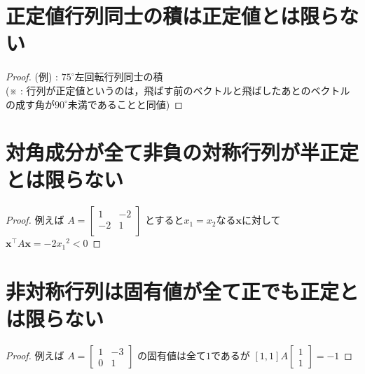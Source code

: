     \section{正定値行列同士の積は正定値とは限らない}
        \begin{proof}
            \quad\par
            (例) : $75^\circ$左回転行列同士の積\\
            (※ : 行列が正定値というのは，飛ばす前のベクトルと飛ばしたあとのベクトルの成す角が$90^\circ$未満であることと同値)
        \end{proof}
    \section{対角成分が全て非負の対称行列が半正定とは限らない}
        \begin{proof}
            \quad\par
            例えば
            $
                A =
                \left[
                    \begin{array}{cc}
                        1 & -2\\
                        -2 & 1\\
                    \end{array}
                \right]
            $
            とすると$x_1=x_2$なる$\bm{x}$に対して$\bm{x}^\top A\bm{x} = -2{x_1}^2 < 0$
        \end{proof}
    \section{非対称行列は固有値が全て正でも正定とは限らない}
        \begin{proof}
            \quad\par
            例えば
            $
                A =
                \begin{bmatrix}
                    1 & -3 \\
                    0 & 1
                \end{bmatrix}
            $
            の固有値は全て$1$であるが
            $
                [1,1]A
                \begin{bmatrix}
                    1 \\
                    1
                \end{bmatrix}
                = -1
            $
        \end{proof}
